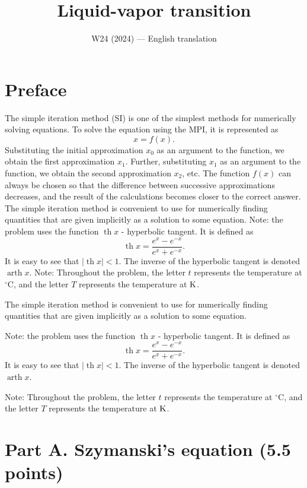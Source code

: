 \documentclass[11pt,a4paper]{article}
\title{\textbf{Liquid-vapor transition}}
\author{\normalsize W24 (2024) --- English translation}
\date{}
\begin{document}
\maketitle

\section*{Preface}

The simple iteration method (SI) is one of the simplest methods for numerically solving equations. To solve the equation using the MPI, it is represented as \[x=f(x).\]Substituting the initial approximation $x_0$ as an argument to the function, we obtain the first approximation $x_1$. Further, substituting $x_1$ as an argument to the function, we obtain the second approximation $x_2$, etc. The function $f(x)$ can always be chosen so that the difference between successive approximations decreases, and the result of the calculations becomes closer to the correct answer. The simple iteration method is convenient to use for numerically finding quantities that are given implicitly as a solution to some equation. Note: the problem uses the function $\operatorname{th}x$ - hyperbolic tangent. It is defined as \[\operatorname{th}x=\frac{e^x-e^{-x}}{e^x+e^{-x}}.\]It is easy to see that $|\operatorname{th}x| < 1$. The inverse of the hyperbolic tangent is denoted $\operatorname{arth}x$. Note: Throughout the problem, the letter $t$ represents the temperature at ${}^\circ\mathrm C$, and the letter $T$ represents the temperature at $\rm K$.

The simple iteration method is convenient to use for numerically finding quantities that are given implicitly as a solution to some equation.

Note: the problem uses the function $\operatorname{th}x$ - hyperbolic tangent. It is defined as \[\operatorname{th}x=\frac{e^x-e^{-x}}{e^x+e^{-x}}.\]It is easy to see that $|\operatorname{th}x| < 1$. The inverse of the hyperbolic tangent is denoted $\operatorname{arth}x$.

Note: Throughout the problem, the letter $t$ represents the temperature at ${}^\circ\mathrm C$, and the letter $T$ represents the temperature at $\rm K$.

\section*{Part A. Szymanski's equation (5.5 points)}
\end{document}
